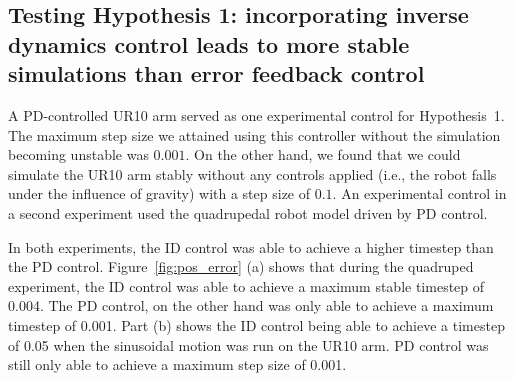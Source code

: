 \documentclass[conference]{IEEEtran}
\begin{document}
\subsection{Testing Hypothesis 1: incorporating inverse dynamics control leads to more stable simulations than error feedback control}

A PD-controlled UR10 arm served as one experimental control for Hypothesis~1. The maximum step size we attained using this controller without the simulation becoming unstable was $0.001$. On the other hand, we found that we could simulate the UR10 arm stably without any controls applied (i.e., the robot falls under the influence of gravity) with a step size of $0.1$. An experimental control in a second experiment used the quadrupedal robot model driven by PD control. 



In both experiments, the ID control was able to achieve a higher timestep than the PD control. Figure~\ref{fig:pos_error} (a) shows that during the quadruped experiment, the ID control was able to achieve a maximum stable timestep of 0.004. The PD control, on the other hand was only able to achieve a maximum timestep of 0.001. Part (b) shows the ID control being able to achieve a timestep of 0.05 when the sinusoidal motion was run on the UR10 arm.  PD control was still only able to achieve a maximum step size of 0.001.  %
\end{document}
